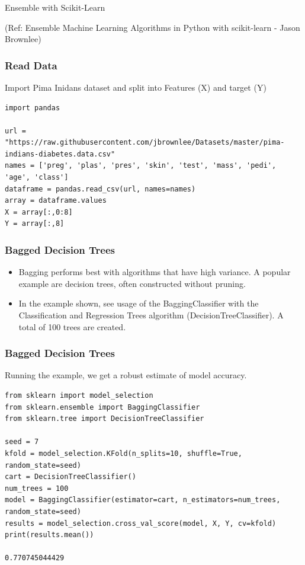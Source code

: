 \begin{frame}[fragile]\frametitle{}
\begin{center}
{\Large Ensemble with Scikit-Learn}

{\tiny (Ref: Ensemble Machine Learning Algorithms in Python with scikit-learn - Jason Brownlee)}
\end{center}
\end{frame}

\begin{frame}[fragile]\frametitle{Read Data}
Import Pima Inidans dataset and split into Features (X) and target (Y)
\begin{lstlisting}
import pandas

url = "https://raw.githubusercontent.com/jbrownlee/Datasets/master/pima-indians-diabetes.data.csv"
names = ['preg', 'plas', 'pres', 'skin', 'test', 'mass', 'pedi', 'age', 'class']
dataframe = pandas.read_csv(url, names=names)
array = dataframe.values
X = array[:,0:8]
Y = array[:,8]
\end{lstlisting}
\end{frame}

\begin{frame}[fragile]\frametitle{Bagged Decision Trees}

	\begin{itemize}
	\item Bagging performs best with algorithms that have high variance. A popular example are decision trees, often constructed without pruning.
	\item In the example shown, see usage of the BaggingClassifier with the Classification and Regression Trees algorithm (DecisionTreeClassifier). A total of 100 trees are created.
	\end{itemize}
	
\end{frame}

\begin{frame}[fragile]\frametitle{Bagged Decision Trees}
Running the example, we get a robust estimate of model accuracy.

\begin{lstlisting}
from sklearn import model_selection
from sklearn.ensemble import BaggingClassifier
from sklearn.tree import DecisionTreeClassifier

seed = 7
kfold = model_selection.KFold(n_splits=10, shuffle=True, random_state=seed)
cart = DecisionTreeClassifier()
num_trees = 100
model = BaggingClassifier(estimator=cart, n_estimators=num_trees, random_state=seed)
results = model_selection.cross_val_score(model, X, Y, cv=kfold)
print(results.mean())

0.770745044429
\end{lstlisting}
\end{frame}



